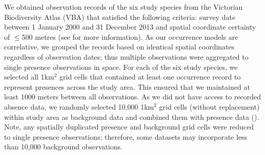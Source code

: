 We obtained observation records of the six study species from the Victorian Biodiversity Atlas (VBA) that satisfied the following criteria: survey date between 1 January 2000 and 31 December 2013 and spatial coordinate certainty of $\leq$500 metres (see  for more information).  As our occurrence models are correlative, we grouped the records based on identical spatial coordinates regardless of observation dates; thus multiple observations were aggregated to single presence observations in space. For each of the six study species, we selected all 1km$^2$ grid cells that contained at least one occurrence record to represent presences across the study area. This ensured that we maintained at least 1000 meters between all observations. As we did not have access to recorded absence data, we randomly selected 10,000 1km$^2$ grid cells (without replacement) within study area as background data and combined them with presence data (). Note, any spatially duplicated presence and background grid cells were reduced to single presence observations; therefore, some datasets may incorporate less than 10,000 background observations.

